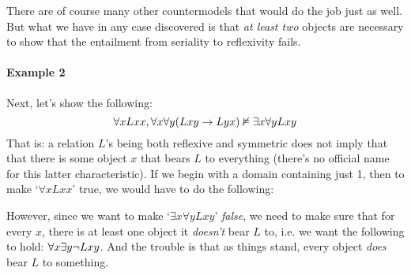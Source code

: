 There are of course many other countermodels that would do the job just as well.  But what we have in any case discovered is that \emph{at least two} objects are necessary to show that the entailment from seriality to reflexivity fails.

\paragraph{Example 2} Next, let's show the following:
$$\forall x Lxx, \forall x\forall y(Lxy \rightarrow Lyx) \nvDash \exists x\forall yLxy$$
That is: a relation $L$'s being both reflexive and symmetric does not imply that that there is some object $x$ that bears $L$ to everything (there's no official name for this latter characteristic).  If we begin with a domain containing just 1, then to make `$\forall xLxx$' true, we would have to do the following:
\begin{center}\end{center}
However, since we want to make `$\exists x\forall yLxy$' \emph{false}, we need to make sure that for every $x$, there is at least one object it \emph{doesn't} bear $L$ to, i.e. we want the following to hold: $\forall x \exists y \neg Lxy$.  And the trouble is that as things stand, every object \emph{does} bear $L$ to something.

